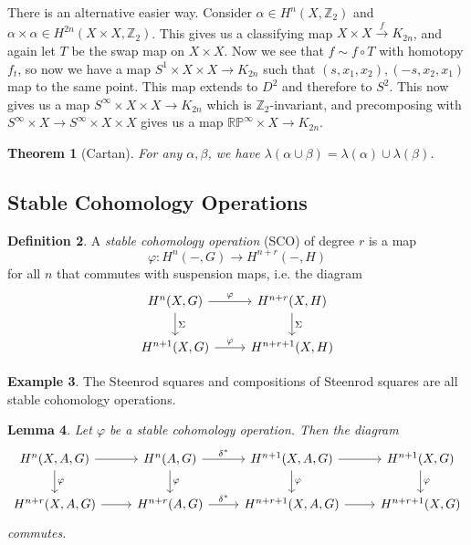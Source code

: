 \documentclass[leqno, openany]{memoir}
\newtheorem{thm}{Theorem}[section]
\newtheorem{lem}[thm]{Lemma}
\theoremstyle{definition}
\newtheorem{defn}[thm]{Definition}
\newtheorem{exm}[thm]{Example}
\theoremstyle{remark}
\theoremstyle{plain}
\theoremstyle{definition}
\theoremstyle{remark}
\newcommand{\R}{\mathbb{R}}
\newcommand{\Z}{\mathbb{Z}}
\renewcommand{\P}{\mathbb{P}}
\begin{document}
There is an alternative easier way. Consider $\alpha \in H^n(X, \Z_2)$ and
$\alpha \times \alpha \in H^{2n}(X \times X, \Z_2)$. This gives us a
classifying map $X \times X \xrightarrow{f} K_{2n}$, and again let $T$ be the
swap map on $X \times X$. Now we see that $f \sim f \circ T$ with homotopy
$f_t$, so now we have a map $S^1 \times X \times X \to K_{2n}$ such that
$(s,x_1, x_2), (-s, x_2, x_1)$ map to the same point. This map extends to $D^2$
and therefore to $S^2$. This now gives us a map $S^{\infty} \times X \times X
\to K_{2n}$ which is $\Z_2$-invariant, and precomposing with $S^{\infty} \times
X \to S^{\infty} \times X \times X$ gives us a map $\R\P^{\infty} \times X \to
K_{2n}$.

\begin{thm}[Cartan] For any $\alpha, \beta$, we have $\lambda(\alpha \cup
\beta) = \lambda(\alpha) \cup \lambda(\beta)$.  \end{thm}

\subsection{Stable Cohomology Operations}%
\label{sub:stable_cohomology_operations}

\begin{defn} A \textit{stable cohomology operation} (SCO) of degree $r$ is a
    map \[ \varphi \colon H^n(-, G) \to H^{n+r}(-, H) \] for all $n$ that
    commutes with suspension maps, i.e. the diagram \begin{equation*}
        \begin{tikzcd} H^n(X, G) \ar{r}{\varphi} \ar{d}{\Sigma} & H^{n+r}(X, H)
            \ar{d}{\Sigma} \\ H^{n+1}(X, G) \ar{r}{\varphi} & H^{n+r+1}(X, H)
        \end{tikzcd} \end{equation*} \end{defn}

\begin{exm} The Steenrod squares and compositions of Steenrod squares are all
stable cohomology operations.  \end{exm}

\begin{lem} Let $\varphi$ be a stable cohomology operation. Then the diagram
    \begin{equation*} \begin{tikzcd} H^n(X,A,G) \ar{r} \ar{d}{\varphi}& H^n(A,
        G) \ar{r}{\delta^*} \ar{d}{\varphi}& H^{n+1}(X,A,G) \ar{r}
        \ar{d}{\varphi}& H^{n+1}(X, G) \ar{d}{\varphi}\\ H^{n+r}(X,A,G) \ar{r}
                       & H^{n+r}(A, G) \ar{r}{\delta^*} & H^{n+r+1}(X,A,G)
    \ar{r} & H^{n+r+1}(X, G) \end{tikzcd} \end{equation*} commutes.  \end{lem}
\end{document}

